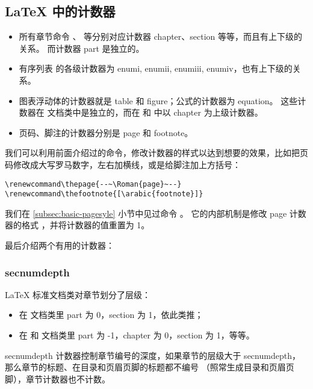 \subsection{\LaTeX{} 中的计数器}\label{subsec:latex-counts}

\begin{itemize}
  \item 所有章节命令 、 等分别对应计数器 chapter、section 等等，而且有上下级的关系。
        而计数器 part 是独立的。
  \item 有序列表  的各级计数器为 enumi, enumii, enumiii, enumiv，也有上下级的关系。
  \item 图表浮动体的计数器就是 table 和 figure；公式的计数器为 equation。
        这些计数器在  文档类中是独立的，而在  和  中以 chapter 为上级计数器。
  \item 页码、脚注的计数器分别是 page 和 footnote。
\end{itemize}

我们可以利用前面介绍过的命令，修改计数器的样式以达到想要的效果，比如把页码修改成大写罗马数字，左右加横线，或是给脚注加上方括号：
\begin{verbatim}
\renewcommand\thepage{--~\Roman{page}~--}
\renewcommand\thefootnote{[\arabic{footnote}]}
\end{verbatim}

我们在 \ref{subsec:basic-pagesyle} 小节中见过命令 。
它的内部机制是修改 page 计数器的格式 ，并将计数器的值重置为 1。

最后介绍两个有用的计数器：

\subsubsection{secnumdepth}

\LaTeX{} 标准文档类对章节划分了层级：
\begin{itemize}
  \item 在  文档类里 part 为 0，section 为 1，依此类推；
  \item 在  和  文档类里 part 为 -1，chapter 为 0，section 为 1，等等。
\end{itemize}

secnumdepth 计数器控制章节编号的深度，如果章节的层级大于 secnumdepth，那么章节的标题、在目录和页眉页脚的标题都不编号
（照常生成目录和页眉页脚），章节计数器也不计数。

